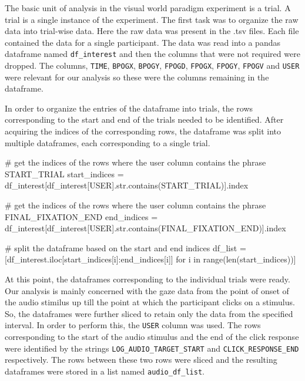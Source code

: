 \documentclass[
  a4paper,
]{article}
\newenvironment{Shaded}{}{}
\newcommand{\BuiltInTok}[1]{\textcolor[rgb]{0.84,0.23,0.29}{#1}}
\newcommand{\CommentTok}[1]{\textcolor[rgb]{0.42,0.45,0.49}{#1}}
\newcommand{\ControlFlowTok}[1]{\textcolor[rgb]{0.84,0.23,0.29}{#1}}
\newcommand{\KeywordTok}[1]{\textcolor[rgb]{0.84,0.23,0.29}{#1}}
\newcommand{\NormalTok}[1]{\textcolor[rgb]{0.14,0.16,0.18}{#1}}
\newcommand{\OperatorTok}[1]{\textcolor[rgb]{0.14,0.16,0.18}{#1}}
\newcommand{\StringTok}[1]{\textcolor[rgb]{0.01,0.18,0.38}{#1}}
\begin{document}
The basic unit of analysis in the visual world paradigm experiment is a
trial. A trial is a single instance of the experiment. The first task
was to organize the raw data into trial-wise data. Here the raw data was
present in the .tsv files. Each file contained the data for a single
participant. The data was read into a pandas dataframe named
\texttt{df\_interest} and then the columns that were not required were
dropped. The columns, \texttt{TIME}, \texttt{BPOGX}, \texttt{BPOGY},
\texttt{FPOGD}, \texttt{FPOGX}, \texttt{FPOGY}, \texttt{FPOGV} and
\texttt{USER} were relevant for our analysis so these were the columns
remaining in the dataframe.

In order to organize the entries of the dataframe into trials, the rows
corresponding to the start and end of the trials needed to be
identified. After acquiring the indices of the corresponding rows, the
dataframe was split into multiple dataframes, each corresponding to a
single trial.

\begin{Shaded}
\begin{Highlighting}[]
\CommentTok{\# get the indices of the rows where the user column contains the phrase \textquotesingle{}START\_TRIAL\textquotesingle{}}
\NormalTok{start\_indices }\OperatorTok{=}\NormalTok{ df\_interest[df\_interest[}\StringTok{\textquotesingle{}USER\textquotesingle{}}\NormalTok{].}\BuiltInTok{str}\NormalTok{.contains(}\StringTok{\textquotesingle{}START\_TRIAL\textquotesingle{}}\NormalTok{)].index}

\CommentTok{\# get the indices of the rows where the user column contains the phrase \textquotesingle{}FINAL\_FIXATION\_END\textquotesingle{}}
\NormalTok{end\_indices }\OperatorTok{=}\NormalTok{ df\_interest[df\_interest[}\StringTok{\textquotesingle{}USER\textquotesingle{}}\NormalTok{].}\BuiltInTok{str}\NormalTok{.contains(}\StringTok{\textquotesingle{}FINAL\_FIXATION\_END\textquotesingle{}}\NormalTok{)].index}

\CommentTok{\# split the dataframe based on the start and end indices}
\NormalTok{df\_list }\OperatorTok{=}\NormalTok{ [df\_interest.iloc[start\_indices[i]:end\_indices[i]] }\ControlFlowTok{for}\NormalTok{ i }\KeywordTok{in} \BuiltInTok{range}\NormalTok{(}\BuiltInTok{len}\NormalTok{(start\_indices))]}
\end{Highlighting}
\end{Shaded}

At this point, the dataframes corresponding to the individual trials
were ready. Our analysis is mainly concerned with the gaze data from the
point of onset of the audio stimilus up till the point at which the
participant clicks on a stimulus. So, the dataframes were further sliced
to retain only the data from the specified interval. In order to perform
this, the \texttt{USER} column was used. The rows corresponding to the
start of the audio stimulus and the end of the click response were
identified by the strings \texttt{LOG\_AUDIO\_TARGET\_START} and
\texttt{CLICK\_RESPONSE\_END} respectively. The rows between these two
rows were sliced and the resulting dataframes were stored in a list
named \texttt{audio\_df\_list}.
\end{document}
